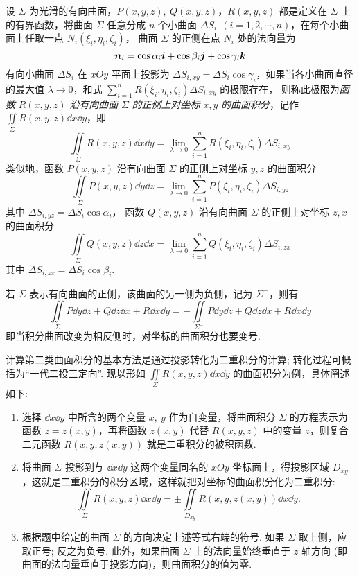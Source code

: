\begin{definition}
    设 $\varSigma$ 为光滑的有向曲面，$P(x,y,z),~Q(x,y,z)$，$R(x,y,z)$ 都是定义在 $\varSigma$ 上的有界函数，将曲面 $\varSigma$ 任意分成 $n$ 个小曲面 $\Delta S_i~~(i=1,2,\cdots,n)$，在每个小曲面上任取一点 $N_i(\xi_i,\eta_i,\zeta_i)$，
    曲面 $\varSigma$ 的正侧在点 $N_i$ 处的法向量为 $$\vb*{n}_i=\cos\alpha_i\vb*{i}+\cos\beta_i\vb*{j}+\cos\gamma_i\vb*{k}$$
    有向小曲面 $\Delta S_i$ 在 $xOy$ 平面上投影为 $\Delta S_{i,xy}=\Delta S_i\cos\gamma_i$，如果当各小曲面直径的最大值 $\lambda\to0$，和式 $\displaystyle\sum_{i=1}^{n}R(\xi_i,\eta_i,\zeta_i)\Delta S_{i,xy}$ 的极限存在，
    则称此极限为\textit{函数} $R(x,y,z)$ \textit{沿有向曲面} $\varSigma$ \textit{的正侧上对坐标} $x,y$ \textit{的曲面积分}，记作 $\displaystyle\iint\limits_\varSigma R(x,y,z)\dd x\dd y$，即 
    $$\iint\limits_\varSigma R(x,y,z)\dd x\dd y=\lim_{\lambda\to0}\sum_{i=1}^{n}R(\xi_i,\eta_i,\zeta_i)\Delta S_{i,xy}$$
    类似地，函数 $P(x,y,z)$ 沿有向曲面 $\varSigma$ 的正侧上对坐标 $y,z$ 的曲面积分 
    $$\iint\limits_\varSigma P(x,y,z)\dd y\dd z=\lim_{\lambda\to0}\sum_{i=1}^{n}P(\xi_i,\eta_i,\zeta_i)\Delta S_{i,yz}$$
    其中 $\Delta S_{i,yz}=\Delta S_{i}\cos\alpha_i$，
    函数 $Q(x,y,z)$ 沿有向曲面 $\varSigma$ 的正侧上对坐标 $z,x$ 的曲面积分 
    $$\iint\limits_\varSigma Q(x,y,z)\dd z\dd x=\lim_{\lambda\to0}\sum_{i=1}^{n}Q(\xi_i,\eta_i,\zeta_i)\Delta S_{i,zx}$$
    其中 $\Delta S_{i,zx}=\Delta S_{i}\cos\beta_i$.
\end{definition}

\begin{theorem}
    若 $\varSigma$ 表示有向曲面的正侧，该曲面的另一侧为负侧，记为 $\varSigma^-$，则有 
    $$\iint\limits_\varSigma P\dd y\dd z+Q\dd z\dd x+R\dd x\dd y=-\iint\limits_{\varSigma^-} P\dd y\dd z+Q\dd z\dd x+R\dd x\dd y$$
    即当积分曲面改变为相反侧时，对坐标的曲面积分也要变号.
\end{theorem}

计算第二类曲面积分的基本方法是通过投影转化为二重积分的计算; 转化过程可概括为“一代二投三定向”.
现以形如 $\displaystyle\iint\limits_\varSigma R(x,y,z)\dd x\dd y$ 的曲面积分为例，具体阐述如下:
\begin{enumerate}[label=(\arabic{*})]
    \item 选择 $\dd x\dd y$ 中所含的两个变量 $x,~y$ 作为自变量，将曲面积分 $\varSigma$ 的方程表示为函数 $z=z(x,y)$，再将函数 $z(x,y)$ 代替 $R(x,y,z)$ 中的变量 $z$，则复合二元函数 $R(x,y,z(x,y))$ 就是二重积分的被积函数.
    \item 将曲面 $\varSigma$ 投影到与 $\dd x\dd y$ 这两个变量同名的 $xOy$ 坐标面上，得投影区域 $D_{xy}$，这就是二重积分的积分区域，这样就把对坐标的曲面积分化为二重积分:
          $$\iint\limits_\varSigma R(x,y,z)\dd x\dd y=\pm\iint\limits_{D_{xy}}R(x,y,z(x,y))\dd x\dd y.$$
    \item 根据题中给定的曲面 $\varSigma$ 的方向决定上述等式右端的符号. 如果 $\varSigma$ 取上侧，应取正号; 反之为负号. 此外，如果曲面 $\varSigma$ 上的法向量始终垂直于 $z$ 轴方向 (即曲面的法向量垂直于投影方向)，则曲面积分的值为零.
\end{enumerate}


